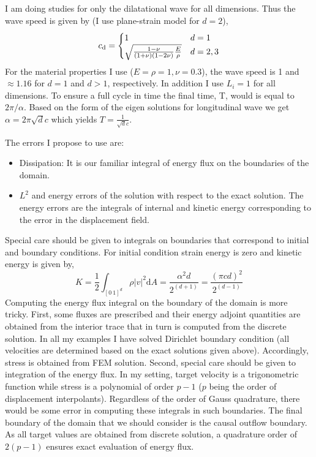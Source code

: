 \documentclass[12pt]{article}
\newcommand{\CD}{c_{\text d}}   %
\begin{document}
I am doing studies for only the dilatational wave for all dimensions. Thus the wave speed is given by (I use plane-strain model for $d = 2$),
%
\begin{equation}
\CD = \begin{cases} 
1 & d = 1 \\
\sqrt{ \frac{ 1 - \nu} {(1 + \nu)  (1 - 2  \nu) } \frac{E}{\rho}} & d = 2,3
\end{cases}
\end{equation}
%
For the material properties I use ($E = \rho = 1, \nu = 0.3$), the wave speed is 1 and $\approx 1.16$ for $d = 1$ and $ d > 1$, respectively. In addition I use $L_i = 1$ for all dimensions. To ensure a full cycle in time the final time, T, would is equal to $2 \pi / \alpha$.  Based on the form of the eigen solutions for longitudinal wave we get  $\alpha = 2 \pi \sqrt{d} c $ which yields $T = \frac{1} {\sqrt d c}$. 

The errors I propose to use are:

\begin{itemize}
\item Dissipation: It is our familiar integral of energy flux on the boundaries of the domain. 
\item $L^2$ and energy errors of the solution with respect to the exact solution. The energy errors are the integrals of internal and kinetic energy corresponding to the error in the displacement field.
\end{itemize}



Special care should be given to integrals on boundaries that correspond to initial and boundary conditions. For initial condition strain energy is zero and kinetic energy is given by,
\begin{equation}
K = \frac12 \int_{[0 \ 1]^d} \rho |v|^2 \mathrm{d} A = \frac{\alpha^2 d}{2^{(d + 1)}} = \frac{(\pi  c d)^2}{2^{(d-1)}} 
\end{equation}
%
Computing the energy flux integral on the boundary of the domain is more tricky. First, some fluxes are prescribed and their energy adjoint quantities are obtained from the interior trace that in turn is computed from the discrete solution. In all my examples I have solved Dirichlet boundary condition (all velocities are determined based on the exact solutions given above). Accordingly, stress is obtained from FEM solution. Second, special care should be given to integration of the energy flux. In my setting, target velocity is a trigonometric function while stress is a polynomial of order $p - 1$ ($p$ being the order of displacement interpolants). Regardless of the order of Gauss quadrature, there would be some error in computing these integrals in such boundaries. The final boundary of the domain that we should consider is the causal outflow boundary. As all target values are obtained from discrete solution, a quadrature order of $2 (p - 1)$ ensures exact evaluation of energy flux.
\end{document}
